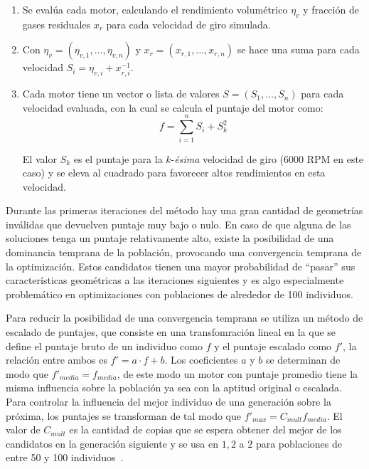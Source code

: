\begin{enumerate}
        \item Se evalúa cada motor, calculando el rendimiento volumétrico
$\eta_{v}$ y fracción de gases residuales $x_{r}$ para cada velocidad de giro
simulada.
        \item Con $\eta_{v} = (\eta_{v,1}, \ldots ,\eta_{v,n})$ y
$x_{r}=(x_{r,1},\ldots,x_{r,n})$ se hace una suma para cada velocidad
$S_{i}=\eta_{v,i} + x_{r,i}^{-1}$.
        \item Cada motor tiene un vector o lista de valores
$S = (S_{1},\ldots,S_{n})$ para cada velocidad evaluada, con la cual se calcula
el puntaje del motor como:
        \begin{equation}
        f = \sum_{i=1}^{n}{S_{i}} + S_{k}^{2}
      \end{equation}

El valor $S_{k}$ es el puntaje para la $k$-\textit{ésima} velocidad de giro (6000 RPM en
este caso) y se eleva al cuadrado para favorecer altos rendimientos en esta
velocidad.
\end{enumerate}


Durante las primeras iteraciones del método hay una gran cantidad de geometrías
inválidas que devuelven puntaje muy bajo o nulo.
%
En caso de que alguna de las soluciones tenga un puntaje relativamente alto,
existe la posibilidad de una dominancia temprana de la población, provocando
una convergencia temprana de la optimización.
%
Estos candidatos tienen una mayor probabilidad de ``pasar'' sus características
geométricas a las iteraciones siguientes y es algo especialmente problemático en
optimizaciones con poblaciones de alrededor de 100 individuos.

Para reducir la posibilidad de una convergencia temprana se utiliza un método de
escalado de puntajes, que consiste en una transfomración lineal en la que se
define el puntaje bruto de un individuo como $f$ y el puntaje escalado como
$f'$, la relación entre ambos es $f' = a\cdot f + b$.
%
Los coeficientes $a$ y $b$ se determinan de modo que $f'_{media}=f_{media}$, de
este modo un motor con puntaje promedio tiene la misma influencia sobre la
población ya sea con la aptitud original o escalada.
%
Para controlar la influencia del mejor individuo de una generación sobre la
próxima, los puntajes se transforman de tal modo que
$f'_{max}=C_{mult}f_{media}$.
%
El valor de $C_{mult}$ es la cantidad de copias que se espera obtener del mejor
de los candidatos en la generación siguiente y se usa en $1,2$ a $2$ para
poblaciones de entre 50 y 100 individuos~\parencite{goldberg}.

